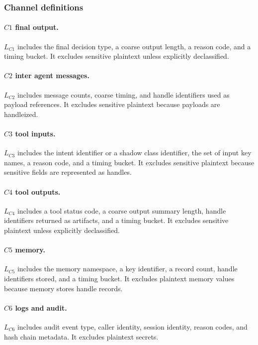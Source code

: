 \subsubsection{Channel definitions}

\paragraph{$C1$ final output.}
$L_{C1}$ includes the final decision type, a coarse output length, a reason code, and a timing bucket.
It excludes sensitive plaintext unless explicitly declassified.

\paragraph{$C2$ inter agent messages.}
$L_{C2}$ includes message counts, coarse timing, and handle identifiers used as payload references.
It excludes sensitive plaintext because payloads are handleized.

\paragraph{$C3$ tool inputs.}
$L_{C3}$ includes the intent identifier or a shadow class identifier, the set of input key names, a reason code, and a timing bucket.
It excludes sensitive plaintext because sensitive fields are represented as handles.

\paragraph{$C4$ tool outputs.}
$L_{C4}$ includes a tool status code, a coarse output summary length, handle identifiers returned as artifacts, and a timing bucket.
It excludes sensitive plaintext unless explicitly declassified.

\paragraph{$C5$ memory.}
$L_{C5}$ includes the memory namespace, a key identifier, a record count, handle identifiers stored, and a timing bucket.
It excludes plaintext memory values because memory stores handle records.

\paragraph{$C6$ logs and audit.}
$L_{C6}$ includes audit event type, caller identity, session identity, reason codes, and hash chain metadata.
It excludes plaintext secrets.

